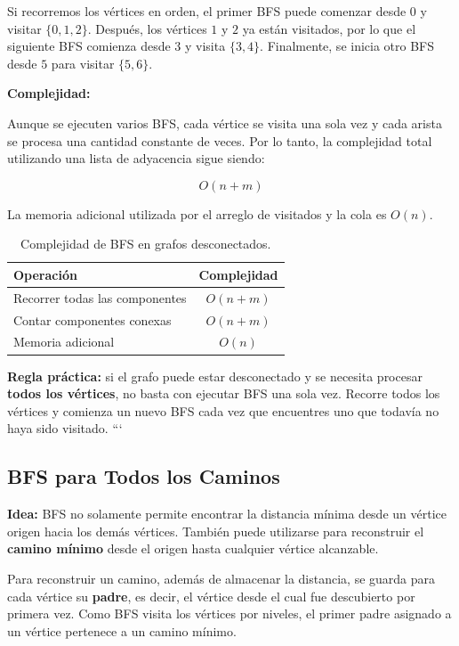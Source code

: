 \documentclass[10pt,a4paper,twocolumn]{article}
\begin{document}
Si recorremos los vértices en orden, el primer BFS puede comenzar
desde $0$ y visitar $\{0,1,2\}$. Después, los vértices $1$ y $2$ ya
están visitados, por lo que el siguiente BFS comienza desde $3$ y
visita $\{3,4\}$. Finalmente, se inicia otro BFS desde $5$ para
visitar $\{5,6\}$.

\textbf{Complejidad:}

Aunque se ejecuten varios BFS, cada vértice se visita una sola vez y
cada arista se procesa una cantidad constante de veces. Por lo tanto,
la complejidad total utilizando una lista de adyacencia sigue siendo:

\[
O(n+m)
\]

La memoria adicional utilizada por el arreglo de visitados y la cola
es $O(n)$.

\begin{table}[H]
\raggedright
\scriptsize
\setlength{\tabcolsep}{3pt}
\renewcommand{\arraystretch}{1.1}
\begin{tabular}{|l|c|}
\hline
\textbf{Operación} & \textbf{Complejidad} \\
\hline
Recorrer todas las componentes & $O(n+m)$ \\
\hline
Contar componentes conexas & $O(n+m)$ \\
\hline
Memoria adicional & $O(n)$ \\
\hline
\end{tabular}
\caption{Complejidad de BFS en grafos desconectados.}
\end{table}

\textbf{Regla práctica:} si el grafo puede estar desconectado y se
necesita procesar \textbf{todos los vértices}, no basta con ejecutar
BFS una sola vez. Recorre todos los vértices y comienza un nuevo BFS
cada vez que encuentres uno que todavía no haya sido visitado.
```


\subsection{BFS para Todos los Caminos}

\textbf{Idea:} BFS no solamente permite encontrar la distancia mínima
desde un vértice origen hacia los demás vértices. También puede
utilizarse para reconstruir el \textbf{camino mínimo} desde el origen
hasta cualquier vértice alcanzable.

Para reconstruir un camino, además de almacenar la distancia, se
guarda para cada vértice su \textbf{padre}, es decir, el vértice desde
el cual fue descubierto por primera vez. Como BFS visita los vértices
por niveles, el primer padre asignado a un vértice pertenece a un
camino mínimo.
\end{document}
